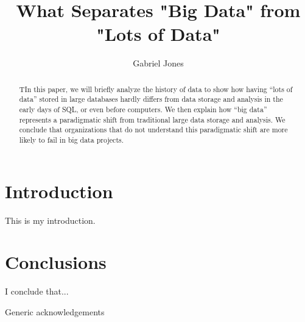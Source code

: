 \documentclass[sigconf]{acmart}
\begin{document}
\title{What Separates "Big Data" from "Lots of Data"}


\author{Gabriel Jones}

\renewcommand{\shortauthors}{G. Jones}


\begin{abstract}
TIn this paper, we will briefly analyze the history of data to show how having “lots of data” stored in large databases hardly differs from data storage and analysis in the early days of SQL, or even before computers. We then explain how “big data” represents a paradigmatic shift from traditional large data storage and analysis. We conclude that organizations that do not understand this paradigmatic shift are more likely to fail in big data projects.
\end{abstract}



\maketitle

\section{Introduction}
This is my introduction.

\section{Conclusions}
I conclude that...



\begin{acks}

Generic acknowledgements

\end{acks}


 
\end{document}
